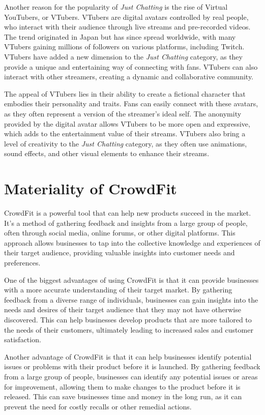 Another reason for the popularity of \emph{Just Chatting} is the rise of Virtual YouTubers, or VTubers. VTubers are 
digital avatars controlled by real people, who interact with their audience through live streams and pre-recorded videos. 
The trend originated in Japan but has since spread worldwide, with many VTubers gaining millions of followers on various 
platforms, including Twitch. VTubers have added a new dimension to the \emph{Just Chatting} category, as they provide a unique 
and entertaining way of connecting with fans. VTubers can also interact with other streamers, creating a dynamic and collaborative community.

The appeal of VTubers lies in their ability to create a fictional character that embodies their personality and traits. 
Fans can easily connect with these avatars, as they often represent a version of the streamer's ideal self. The anonymity 
provided by the digital avatar allows VTubers to be more open and expressive, which adds to the entertainment value of their 
streams. VTubers also bring a level of creativity to the \emph{Just Chatting} category, as they often use animations, sound effects, 
and other visual elements to enhance their streams.

\section{Materiality of CrowdFit}
CrowdFit is a powerful tool that can help new products succeed in the market. It's a method of gathering feedback and insights from a 
large group of people, often through social media, online forums, or other digital platforms. This approach allows businesses 
to tap into the collective knowledge and experiences of their target audience, providing valuable insights into customer needs and preferences.

One of the biggest advantages of using CrowdFit is that it can provide businesses with a more accurate understanding of their 
target market. By gathering feedback from a diverse range of individuals, businesses can gain insights into the needs and desires 
of their target audience that they may not have otherwise discovered. This can help businesses develop products that are more 
tailored to the needs of their customers, ultimately leading to increased sales and customer satisfaction.

Another advantage of CrowdFit is that it can help businesses identify potential issues or problems with their product before it 
is launched. By gathering feedback from a large group of people, businesses can identify any potential issues or areas for improvement, 
allowing them to make changes to the product before it is released. This can save businesses time and money in the long run, as it can 
prevent the need for costly recalls or other remedial actions.

